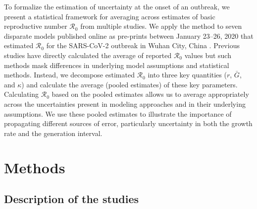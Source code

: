 \documentclass[12pt]{article}
\newcommand{\Ro}{\ensuremath{{\mathcal R}_{0}}\xspace}
\begin{document}
To formalize the estimation of uncertainty at the onset of an outbreak, we present a statistical framework for averaging across estimates of basic reproductive number \Ro from multiple studies. 
We apply the method to seven disparate models published online as pre-prints between January 23--26, 2020 that estimated \Ro for the SARS-CoV-2 outbreak in Wuhan City, China \citep{bedfordncov, imaincov, liuncov, majumderncov, readncov, riouncov, zhaoncov}.
Previous studies have directly calculated the average of reported \Ro values  \citep{majumder2020early, liu2020reproductive} but such methods mask differences in underlying model assumptions and statistical methods.
Instead, we decompose estimated \Ro into three key quantities ($r$, $\bar G$, and $\kappa$) and calculate the average (pooled estimates) of these key parameters.
Calculating \Ro based on the pooled estimates allows us to average appropriately across the uncertainties present in modeling approaches and in their underlying assumptions.
We use these pooled estimates to illustrate the importance of propagating different sources of error, particularly uncertainty in both the growth rate and the generation interval.

\section{Methods}

\subsection{Description of the studies}
\end{document}
